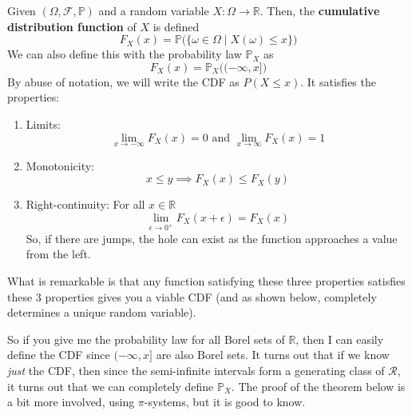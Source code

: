 \documentclass{article}
\begin{document}
      \begin{definition}
        Given $(\Omega, \mathcal{F}, \mathbb{P})$ and a random variable $X: \Omega \rightarrow \mathbb{R}$. Then, the \textbf{cumulative distribution function} of $X$ is defined 
        \begin{equation}
          F_X (x) =\mathbb{P}\big( \{\omega \in \Omega \mid X(\omega) \leq x\} \big)
        \end{equation}
        We can also define this with the probability law $\mathbb{P}_X$ as 
        \begin{equation}
          F_X (x) = \mathbb{P}_X \big( (-\infty, x] \big)
        \end{equation}
        By abuse of notation, we will write the CDF as $P(X \leq x)$. It satisfies the properties: 
        \begin{enumerate}
          \item Limits: 
          \begin{equation}
            \lim_{x \rightarrow -\infty} F_X (x) = 0 \text{ and } \lim_{x \rightarrow \infty} F_X (x) = 1
          \end{equation}
          \item Monotonicity: 
          \begin{equation}
          x \leq y \implies F_X (x) \leq F_X (y)
          \end{equation}
          \item Right-continuity: For all $x \in \mathbb{R}$
          \begin{equation}
            \lim_{\epsilon \rightarrow 0^+} F_X (x + \epsilon) = F_X (x)
          \end{equation}
          So, if there are jumps, the hole can exist as the function approaches a value from the left. 
        \end{enumerate}
        What is remarkable is that any function satisfying these three properties satisfies these 3 properties gives you a viable CDF (and as shown below, completely determines a unique random variable). 
      \end{definition}

      So if you give me the probability law for all Borel sets of $\mathbb{R}$, then I can easily define the CDF since $(-\infty, x]$ are also Borel sets. It turns out that if we know \textit{just} the CDF, then since the semi-infinite intervals form a generating class of $\mathcal{R}$, it turns out that we can completely define $\mathbb{P}_X$. The proof of the theorem below is a bit more involved, using $\pi$-systems, but it is good to know. 
\end{document}
